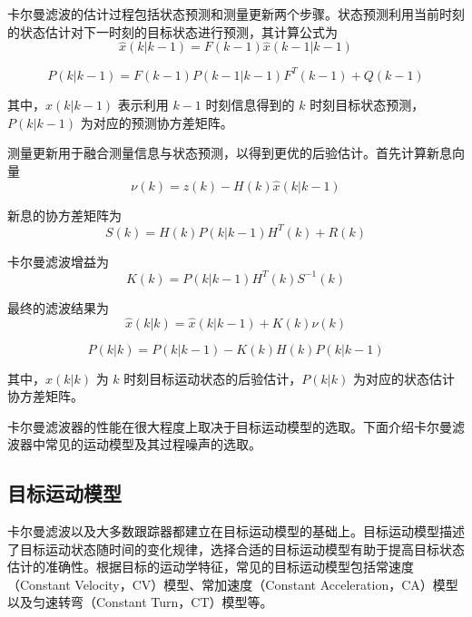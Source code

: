 \documentclass{xdupgthesis}
\begin{document}
卡尔曼滤波的估计过程包括状态预测和测量更新两个步骤。状态预测利用当前时刻的状态估计对下一时刻的目标状态进行预测，其计算公式为
\begin{equation}
	\hat{x}(k|k-1)=F(k-1)\hat{x}(k-1|k-1)
\end{equation}

\begin{equation}
	P(k|k-1)=F(k-1)P(k-1|k-1)F^{T}(k-1)+Q(k-1)
\end{equation}

其中，$\hat{x}(k|k-1)$ 表示利用 $k-1$ 时刻信息得到的 $k$ 时刻目标状态预测，$P(k|k-1)$ 为对应的预测协方差矩阵。

测量更新用于融合测量信息与状态预测，以得到更优的后验估计。首先计算新息向量
\begin{equation}
	\nu(k)=z(k)-H(k)\hat{x}(k|k-1)
\end{equation}

新息的协方差矩阵为
\begin{equation}
	S(k)=H(k)P(k|k-1)H^{T}(k)+R(k)
\end{equation}

卡尔曼滤波增益为
\begin{equation}
	K(k)=P(k|k-1)H^{T}(k)S^{-1}(k)
\end{equation}

最终的滤波结果为
\begin{equation}
	\hat{x}(k|k)=\hat{x}(k|k-1)+K(k)\nu(k)
\end{equation}

\begin{equation}
	P(k|k)=P(k|k-1)-K(k)H(k)P(k|k-1)
\end{equation}

其中，$\hat{x}(k|k)$ 为 $k$ 时刻目标运动状态的后验估计，$P(k|k)$ 为对应的状态估计协方差矩阵。

卡尔曼滤波器的性能在很大程度上取决于目标运动模型的选取。下面介绍卡尔曼滤波器中常见的运动模型及其过程噪声的选取。

\subsection{目标运动模型}

卡尔曼滤波以及大多数跟踪器都建立在目标运动模型的基础上。目标运动模型描述了目标运动状态随时间的变化规律，选择合适的目标运动模型有助于提高目标状态估计的准确性。根据目标的运动学特征，常见的目标运动模型包括常速度（Constant Velocity，CV）模型、常加速度（Constant Acceleration，CA）模型以及匀速转弯（Constant Turn，CT）模型等。
\end{document}
